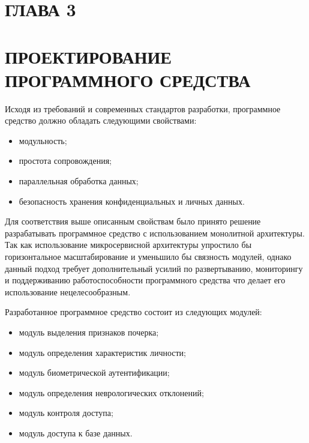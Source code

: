 \section*{ГЛАВА 3}
\section*{ПРОЕКТИРОВАНИЕ ПРОГРАММНОГО СРЕДСТВА}
\setcounter{section}{3}
\setcounter{subsection}{0}
\bigskip

Исходя из требований и современных стандартов разработки, программное средство должно обладать следующими свойствами:
\begin{itemize}
    \item модульность;
    \item простота сопровождения;
    \item параллельная обработка данных;
    \item безопасность хранения конфиденциальных и личных данных.
\end{itemize}

Для соответствия выше описанным свойствам было принято решение разрабатывать программное средство с использованием монолитной архитектуры. Так как использование микросервисной архитектуры упростило бы горизонтальное масштабирование и уменьшило бы связность модулей, однако данный подход требует дополнительный усилий по развертыванию, мониторингу и поддерживанию работоспособности программного средства что делает его использование нецелесообразным. 

Разработанное программное средство состоит из следующих модулей:
\begin{itemize}
    \item модуль выделения признаков почерка;
    \item модуль определения характеристик личности;
    \item модуль биометрической аутентификации;
    \item модуль определения неврологических отклонений;
    \item модуль контроля доступа;
    \item модуль доступа к базе данных.
\end{itemize}

